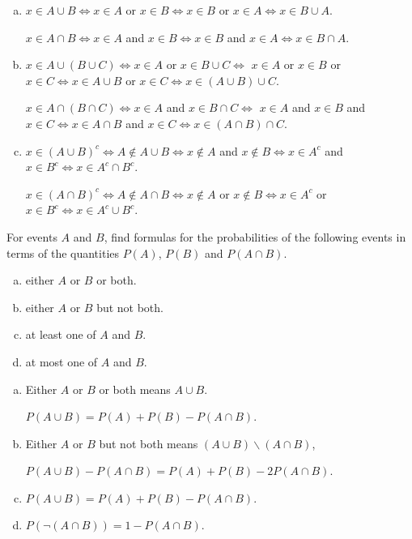 \documentclass[14pt]{elegantbook}
\begin{document}
    \begin{solution}
        \begin{enumerate}[(a)]
            \item $x\in A\cup B\Leftrightarrow x\in A$ or $x\in B\Leftrightarrow x\in B$ or $x\in A\Leftrightarrow x\in B\cup A$. 
            
            $x\in A\cap B\Leftrightarrow x\in A$ and $x\in B\Leftrightarrow x\in B$ and $x\in A\Leftrightarrow x\in B\cap A$. 
            \item $x\in A\cup (B\cup C)\Leftrightarrow x\in A$ or $x\in B\cup C\Leftrightarrow$ $x\in A$ or $x\in B$ or $x\in C\Leftrightarrow x\in A\cup B$ or $x\in C \Leftrightarrow x\in (A\cup B)\cup C$. 
            
            $x\in A\cap (B\cap C)\Leftrightarrow x\in A$ and $x\in B\cap C\Leftrightarrow$ $x\in A$ and $x\in B$ and $x\in C\Leftrightarrow x\in A\cap B$ and $x\in C \Leftrightarrow x\in (A\cap B)\cap C$. 
            \item $x\in (A\cup B)^c\Leftrightarrow A\notin A\cup B \Leftrightarrow x\notin A$ and $x\notin B\Leftrightarrow x\in A^c$ and $x\in B^c\Leftrightarrow x\in A^c\cap B^c$. 
            
            $x\in (A\cap B)^c\Leftrightarrow A\notin A\cap B \Leftrightarrow x\notin A$ or $x\notin B\Leftrightarrow x\in A^c$ or $x\in B^c\Leftrightarrow x\in A^c\cup B^c$. 
        \end{enumerate}
    \end{solution}

    \begin{exercise}
        For events $A$ and $B$, find formulas for the probabilities of the following events in terms of the quantities $P(A)$, $P(B)$ and $P(A\cap B)$. 
        \begin{enumerate}[(a)]
            \item either $A$ or $B$ or both. 
            \item either $A$ or $B$ but not both. 
            \item at least one of $A$ and $B$.
            \item at most one of $A$ and $B$.
        \end{enumerate}
    \end{exercise}

    \begin{solution}
        \begin{enumerate}[(a)]
            \item Either $A$ or $B$ or both means $A\cup B$. 
            
            $P(A\cup B)=P(A)+P(B)-P(A\cap B)$. 
            \item Either $A$ or $B$ but not both means $(A\cup B)\backslash(A\cap B)$, 
            
            $P(A\cup B)-P(A\cap B)=P(A)+P(B)-2P(A\cap B)$. 
            \item $P(A\cup B)=P(A)+P(B)-P(A\cap B)$. 
            \item $P(\neg (A\cap B))=1-P(A\cap B)$. 
        \end{enumerate}
    \end{solution}
\end{document}
